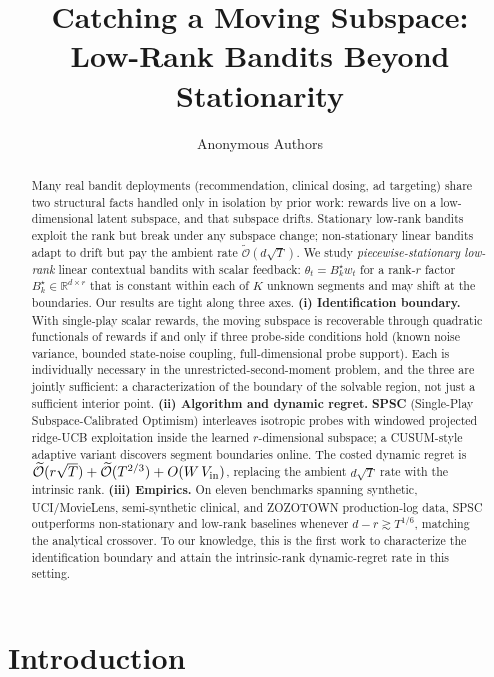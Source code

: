 \documentclass{article}
\title{Catching a Moving Subspace:\\Low-Rank Bandits Beyond Stationarity}
\author{%
  Anonymous Authors%
}
\newcommand{\R}{\mathbb{R}}
\newcommand{\tilO}{\widetilde{\mathcal{O}}}
\begin{document}
\maketitle

\begin{abstract}
Many real bandit deployments (recommendation, clinical dosing, ad
targeting) share two structural facts handled only in isolation by
prior work: rewards live on a low-dimensional latent subspace, and
that subspace drifts. Stationary low-rank bandits exploit the rank
but break under any subspace change; non-stationary linear bandits
adapt to drift but pay the ambient rate $\tilO(d\sqrt T)$. We study
\emph{piecewise-stationary low-rank} linear contextual bandits with
scalar feedback: $\theta_t = B_k^\star w_t$ for a rank-$r$ factor
$B_k^\star\in\R^{d\times r}$ that is constant within each of $K$
unknown segments and may shift at the boundaries. Our results are
tight along three axes. \textbf{(i) Identification boundary.} With
single-play scalar rewards, the moving subspace is recoverable
through quadratic functionals of rewards if and only if three
probe-side conditions hold (known noise variance, bounded
state-noise coupling, full-dimensional probe support). Each is
individually necessary in the unrestricted-second-moment problem,
and the three are jointly sufficient: a characterization of the
boundary of the solvable region, not just a sufficient interior
point. \textbf{(ii) Algorithm and dynamic regret.} \textbf{SPSC}
(Single-Play Subspace-Calibrated Optimism) interleaves isotropic
probes with windowed projected ridge-UCB exploitation inside the
learned $r$-dimensional subspace; a CUSUM-style adaptive variant
discovers segment boundaries online. The costed dynamic regret is
$\tilO(r\sqrt T)+\tilO(T^{2/3})+O(W\,V_{\rm in})$, replacing the
ambient $d\sqrt T$ rate with the intrinsic rank.
\textbf{(iii) Empirics.} On eleven benchmarks spanning synthetic,
UCI/MovieLens, semi-synthetic clinical, and ZOZOTOWN production-log
data, SPSC outperforms non-stationary and low-rank baselines
whenever $d-r\gtrsim T^{1/6}$, matching the analytical crossover.
To our knowledge, this is the first work to characterize the
identification boundary and attain the intrinsic-rank
dynamic-regret rate in this setting.
\end{abstract}

\section{Introduction}
\label{sec:intro}
\end{document}
